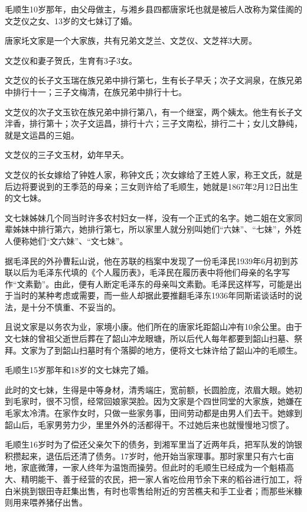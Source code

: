 \documentclass[../../dazhuan.tex]{subfiles}
\begin{document}
毛顺生10岁那年，由父母做主，与湘乡县四都唐家圫也就是被后人改称为棠佳阁的文芝仪之女、13岁的文七妹订了婚。

唐家圫文家是一个大家族，共有兄弟文芝兰、文芝仪、文芝祥3大房。

文芝仪和妻子贺氏，生育有3子3女。

文芝仪的长子文玉瑞在族兄弟中排行第七，生有长子早夭；次子文涧泉，在族兄弟中排行十一；三子文梅清，在族兄弟中排行十七。

文芝仪的次子文玉钦在族兄弟中排行第八，有一个继室，两个姨太。他生有长子文泮香，排行第十；次子文运昌，排行十六；三子文南松，排行二十；女儿文静纯，就是文运昌的三姐。

文芝仪的三子文玉材，幼年早夭。

文芝仪的长女嫁给了钟姓人家，称钟文氏；次女嫁给了王姓人家，称王文氏，就是后边将要说到的王季范的母亲；三女则许给了毛顺生，她就是1867年2月12日出生的文七妹。

文七妹姊妹几个同当时许多农村妇女一样，没有一个正式的名字。她二姐在文家同辈姊妹中排行第六，她排行第七，所以家里人就分别叫她们“六妹”、“七妹”，外姓人便称她们“文六妹”、“文七妹”。

据毛泽民的外孙曹耘山说，他在苏联的档案中发现了一份毛泽民1939年6月初到苏联以后为毛泽东代填的《个人履历表》，毛泽民在履历表中将他们母亲的名字写作“文素勤”。由此，便有人断定毛泽东的母亲叫文素勤。毛泽民这样写，可能是出于当时的某种考虑或需要，而一些人却据此要推翻毛泽东1936年同斯诺谈话时的说法，是十分不慎重、不妥当的。

且说文家是以务农为业，家境小康。他们所在的唐家圫距韶山冲有10余公里。由于文七妹的曾祖父逝世后葬在了韶山冲龙眼塘，所以后代人每年都要到韶山扫墓、祭拜。文家为了到韶山扫墓时有个落脚的地方，便将文七妹许给了韶山冲的毛顺生。

毛顺生15岁那年和18岁的文七妹完了婚。

此时的文七妹，生得是中等身材，清秀端庄，宽前额，长圆脸庞，浓眉大眼。她初到毛家时，很不习惯，经常回娘家哭脸。因为文家是个四世同堂的大家族，她嫌在毛家太冷清。在家作女时，只做一些家务事，田间劳动都是由男人们去干。她嫁到韶山后，毛家男劳力少，里里外外的活都得干。不过她后来也就慢慢地习惯了。

毛顺生16岁时为了偿还父亲欠下的债务，到湘军里当了近两年兵，把军队发的饷银积攒起来，退伍后还清了债务。17岁时，他开始当家理事。那时家里只有六七亩地，家底微薄，一家人终年为温饱而操劳。但此时的毛顺生已经成为一个魁梧高大、精明能干、善于经营的农民，把一家人省吃俭用节余下来的稻谷进行加工，将白米挑到银田寺赶集出售，有时也零售给附近的穷苦樵夫和手工业者；而那些米糠则用来喂养猪仔出售。
\end{document}
